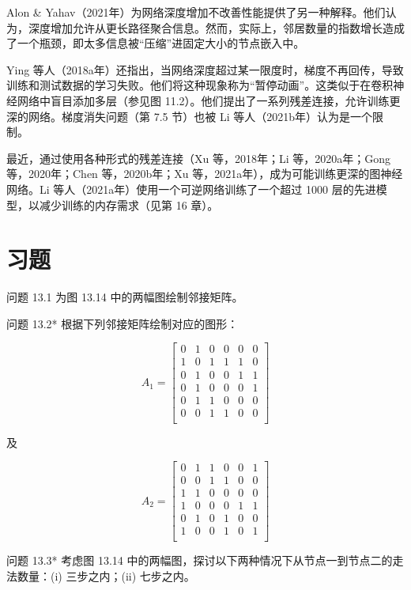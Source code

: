 Alon \& Yahav（2021年）为网络深度增加不改善性能提供了另一种解释。他们认为，深度增加允许从更长路径聚合信息。然而，实际上，邻居数量的指数增长造成了一个瓶颈，即太多信息被“压缩”进固定大小的节点嵌入中。

Ying 等人（2018a年）还指出，当网络深度超过某一限度时，梯度不再回传，导致训练和测试数据的学习失败。他们将这种现象称为“暂停动画”。这类似于在卷积神经网络中盲目添加多层（参见图 11.2）。他们提出了一系列残差连接，允许训练更深的网络。梯度消失问题（第 7.5 节）也被 Li 等人（2021b年）认为是一个限制。

最近，通过使用各种形式的残差连接（Xu 等，2018年；Li 等，2020a年；Gong 等，2020年；Chen 等，2020b年；Xu 等，2021a年），成为可能训练更深的图神经网络。Li 等人（2021a年）使用一个可逆网络训练了一个超过 1000 层的先进模型，以减少训练的内存需求（见第 16 章）。

\section{习题}
问题 13.1 为图 13.14 中的两幅图绘制邻接矩阵。

问题 13.2* 根据下列邻接矩阵绘制对应的图形：

\begin{equation}
A_1 =
\begin{bmatrix}
0 & 1 & 0 & 0 & 0 & 0 \\
1 & 0 & 1 & 1 & 1 & 0 \\
0 & 1 & 0 & 0 & 1 & 1 \\
0 & 1 & 0 & 0 & 0 & 1 \\
0 & 1 & 1 & 0 & 0 & 0 \\
0 & 0 & 1 & 1 & 0 & 0 \\
\end{bmatrix}
\end{equation}

及

\begin{equation}
A_2 =
\begin{bmatrix}
0 & 1 & 1 & 0 & 0 & 1 \\
0 & 0 & 1 & 1 & 0 & 0 \\
1 & 1 & 0 & 0 & 0 & 0 \\
1 & 0 & 0 & 0 & 1 & 1 \\
0 & 1 & 0 & 1 & 0 & 0 \\
1 & 0 & 0 & 1 & 0 & 1 \\
\end{bmatrix}
\end{equation}

问题 13.3* 考虑图 13.14 中的两幅图，探讨以下两种情况下从节点一到节点二的走法数量：(i) 三步之内；(ii) 七步之内。

